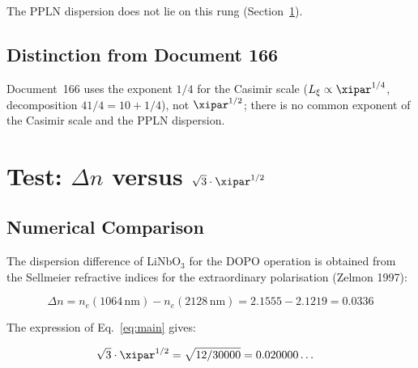 The PPLN dispersion does not lie on this rung (Section~\ref{sec:main_result}).

\subsection{Distinction from Document 166}

Document~166 uses the exponent $1/4$ for the Casimir scale
($L_\xi \propto \xipar^{1/4}$, decomposition $41/4 = 10 + 1/4$), not $\xipar^{1/2}$;
there is no common exponent of the Casimir scale and the PPLN dispersion.

\clearpage

\section{Test: \texorpdfstring{$\Delta n$ versus $\sqrt{3}\cdot\xipar^{1/2}$}{%
  Delta n vs. sqrt(3) xi\^{}(1/2)}}
\label{sec:main_result}

\subsection{Numerical Comparison}

The dispersion difference of LiNbO$_3$ for the DOPO operation is obtained
from the Sellmeier refractive indices for the extraordinary polarisation
(Zelmon 1997):

\begin{equation}
    \Delta n = n_e(1064\,\text{nm}) - n_e(2128\,\text{nm})
    = 2.1555 - 2.1219 = 0.0336
\end{equation}

The expression of Eq.~\eqref{eq:main} gives:

\begin{align}
    \sqrt{3}\cdot\xipar^{1/2}
    &= \sqrt{12/30000} = 0.020000\ldots
\end{align}

\begin{center}
\end{center}

